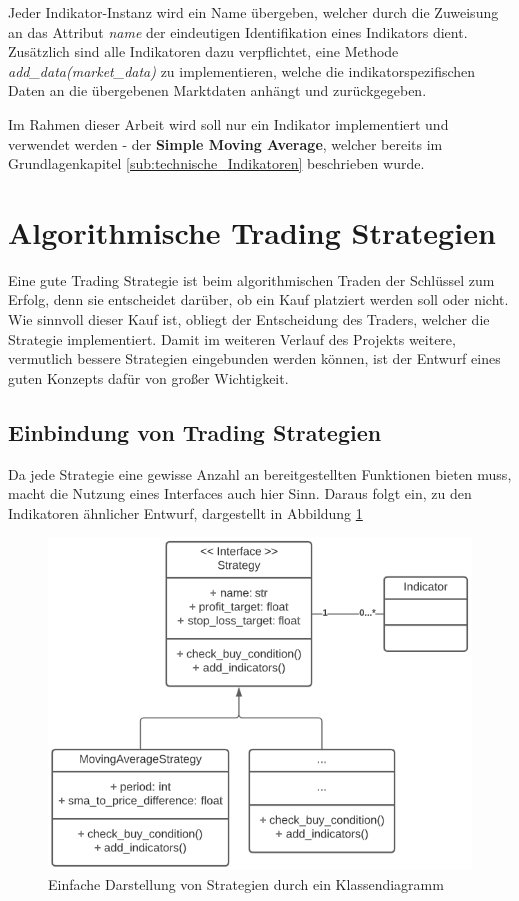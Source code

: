 \documentclass[oneside]{ausarbeitung}
\begin{document}
Jeder Indikator-Instanz wird ein Name übergeben, welcher durch die Zuweisung an das Attribut \textit{name} der eindeutigen Identifikation eines Indikators dient. Zusätzlich sind alle Indikatoren dazu verpflichtet, eine Methode \textit{add\_data(market\_data)} zu implementieren, welche die indikatorspezifischen Daten an die übergebenen Marktdaten anhängt und zurückgegeben.

Im Rahmen dieser Arbeit wird soll nur ein Indikator implementiert und verwendet werden - der \textbf{Simple Moving Average}, welcher bereits im Grundlagenkapitel \ref{sub:technische_Indikatoren} beschrieben wurde.


\section{Algorithmische Trading Strategien}
\label{sec:algorithmische_trading_strategien}

Eine gute Trading Strategie ist beim algorithmischen Traden der Schlüssel zum Erfolg, denn sie entscheidet darüber, ob ein Kauf platziert werden soll oder nicht. Wie sinnvoll dieser Kauf ist, obliegt der Entscheidung des Traders, welcher die Strategie implementiert. Damit im weiteren Verlauf des Projekts weitere, vermutlich bessere Strategien eingebunden werden können, ist der Entwurf eines guten Konzepts dafür von großer Wichtigkeit.

\subsection{Einbindung von Trading Strategien}
\label{sub:einbindung_von_trading_strategien}

Da jede Strategie eine gewisse Anzahl an bereitgestellten Funktionen bieten muss, macht die Nutzung eines Interfaces auch hier Sinn. Daraus folgt ein, zu den Indikatoren ähnlicher Entwurf, dargestellt in Abbildung \ref{fig:11}

\begin{figure}[H]
  \centering
  \includegraphics[height=0.45\textheight]{uml/strategy_uml.png}
  \caption{Einfache Darstellung von Strategien durch ein Klassendiagramm}
  \label{fig:11}
\end{figure}
\end{document}

